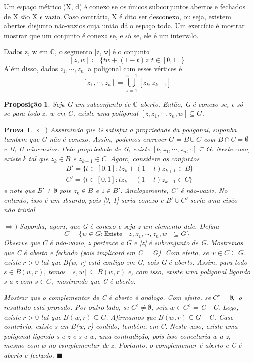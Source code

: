 \documentclass{article}
\newtheorem*{proof*}{\underline{Prova}}
\newtheorem*{prop*}{\underline{Proposi\c c\~ao}}
\renewcommand\qedsymbol{$\blacksquare$}
\begin{document}
  Um espa\c co m\'etrico (X, d) \'e conexo se os \'unicos subconjuntos abertos e fechados de X s\~ao X e vazio. Caso contr\'ario,
  X \'e dito ser desconexo, ou seja, existem abertos disjunto n\~ao-vazios cuja uni\~ao d\'a o espa\c co todo. Um exerc\'icio \'e mostrar
  mostrar que um conjunto \'e conexo se, e s\'o se, ele \'e um intervalo.

  Dados z, w em $\mathbb{C}$, o segmento [z, w] \'e o conjunto
  $$
  [z, w]\coloneqq  \{tw + (1-t)z: t\in[0, 1]\}
  $$
  Al\'em disso, dados $z _{1}, \cdots, z _{n}$, a poligonal com esses v\'ertices \'e
  $$
  [z _{1}, \cdots, z _{n}] = \bigcup _{k=1}^{n-1}[z _{k}, z _{k+1}]
  $$
  \begin{prop*}
    Seja G um subconjunto de $\mathbb{C}$ aberto. Ent\~ao, G \'e conexo se, e s\'o se para todo z, w em G, existe uma poligonal
    $[z, z _{1}, \cdots, z _{n}, w]\subseteq{G}.$
  \end{prop*}
  \begin{proof*}
    $\Leftarrow)$ Assumindo que G satisfaz a propriedade da poligonal, suponha tamb\'em que G n\~ao \'e conexo. Assim,
    podemos escrever $G = B\cup{C}$ com $B\cap{C}=\emptyset$ e B, C n\~ao-vazios. Pela propriedade de G, existe 
    $[b, z _{1}, \cdots, z _{n}, c]\subseteq{G}$. Neste caso, existe k tal que $z _{k}\in{B}$ e $z _{k+1}\in{C}.$ Agora,
    considere os conjuntos 
    \begin{align*}
 &B' = \{t\in[0, 1]: tz _{k} + (1 - t)z _{k+1}\in{B}\}\\
 &C' = \{t\in[0, 1]: tz _{k} + (1 - t)z _{k+1}\in{C}\}
    \end{align*}
    e note que $B'\neq{\emptyset}$ pois $z _{k}\in{B}$ e $1\in{B'}$. Analogamente, C' \'e n\~ao-vazio. No entanto, isso \'e um absurdo,
    pois [0, 1] seria conexo e $B'\cup{C'}$ seria uma cis\~ao n\~ao trivial

    $\Rightarrow)$ Suponha, agora, que G \'e conexo e seja z um elemento dele. Defina 
    $$
    C = \{w\in{G}: \text{Existe } [z, z _{1}, \cdots, z _{n}, w]\subseteq{G}\}
    $$
    Observe que C \'e n\~ao-vazio, z pertence a G e [z] \'e subconjunto de G. Mostremos que C \'e aberto e fechado (pois implicar\'a em C = G).
    Com efeito, se $w\in{C}\subseteq{G}$, existe $r>0$ tal que B(w, r) est\'a contigo em G, pois G \'e aberto.
    Assim, para todo $s\in B(w, r)$, temos $[s, w]\subseteq{B(w, r)}$ e, com isso, existe uma poligonal ligando s a z com $s\in{C},$ mostrando 
    que C \'e aberto.

    Mostrar que o complementar de C \'e aberto \'e an\'alogo. Com efeito, se $C ^{c} = \emptyset,$ o resultado est\'a provado. Por outro
    lado, se $C ^{c}\neq\emptyset$, seja $w\in{C ^{c}}$ = G - C. Logo, existe $r > 0$ tal que $B(w, r)\subseteq{G}$. Afirmamos
    que $B(w, r)\subseteq{G-C}$. Caso contr\'ario, existe s em B(w, r) contido, tamb\'em, em C. Neste caso, existe uma poligonal
    ligando s a z e s a w, uma contradi\c c\~ao, pois isso conectaria w a z, mesmo com w no complementar de z. Portanto, o complementar
    \'e aberto e C \'e aberto e fechado. \qedsymbol
  \end{proof*}
  \newpage
\end{document}
